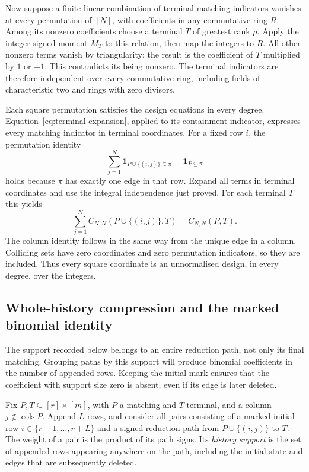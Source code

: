 \documentclass[11pt,a4paper]{article}
\theoremstyle{definition}\newtheorem{definition}[theorem]{Definition}
\theoremstyle{remark}\newtheorem{remark}[theorem]{Remark}
\begin{document}
Now suppose a finite linear combination of terminal matching indicators
vanishes at every permutation of $[N]$, with coefficients in any
commutative ring $R$.  Among its nonzero coefficients choose a terminal
$T$ of greatest rank $\rho$.  Apply the integer signed moment $M_T$ to
this relation, then map the integers to $R$.  All other nonzero terms
vanish by triangularity; the result is the coefficient of $T$ multiplied
by $1$ or $-1$.  This contradicts its being nonzero.  The terminal
indicators are therefore independent over every commutative ring,
including fields of characteristic two and rings with zero divisors.

Each square permutation satisfies the design equations in every degree.
Equation~\eqref{eq:terminal-expansion}, applied to its containment
indicator, expresses every matching indicator in terminal coordinates.
For a fixed row $i$, the permutation identity
\[
 \sum_{j=1}^{N}\boldsymbol{1}_{P\cup\{(i,j)\}\subseteq\pi}
       =\boldsymbol{1}_{P\subseteq\pi}
\]
holds because $\pi$ has exactly one edge in that row.  Expand all terms
in terminal coordinates and use the integral independence just proved.
For each terminal $T$ this yields
\[
 \sum_{j=1}^{N}C_{N,N}(P\cup\{(i,j)\},T)=C_{N,N}(P,T).
\]
The column identity follows in the same way from the unique edge in a
column.  Colliding sets have zero coordinates and zero permutation
indicators, so they are included.  Thus every square coordinate is an
unnormalised design, in every degree, over the integers.

\subsection{Whole-history compression and the marked binomial identity}
The support recorded below belongs to an entire reduction path, not
only its final matching. Grouping paths by this support will produce
binomial coefficients in the number of appended rows. Keeping the
initial mark ensures that the coefficient with support size zero is
absent, even if its edge is later deleted.

Fix $P,T\subseteq[r]\times[m]$, with $P$ a matching and $T$ terminal, and a column
$j\notin\operatorname{cols}P$.  Append $L$ rows, and consider all pairs
consisting of a marked initial row $i\in\{r+1,\ldots,r+L\}$ and a signed
reduction path from $P\cup\{(i,j)\}$ to $T$.  The weight of a pair is the
product of its path signs.  Its \emph{history support} is the set of
appended rows appearing anywhere on the path, including the initial
state and edges that are subsequently deleted.
\end{document}
